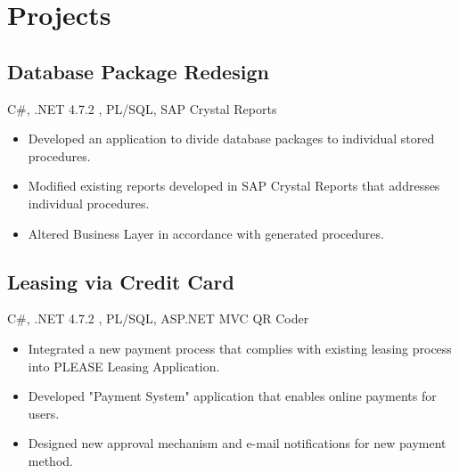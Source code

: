 \documentclass[1pt,a4paper,verdana]{moderncv} %
\begin{document}
\section{Projects}
\subsection{Database Package Redesign}
 {C\#, .NET 4.7.2 , PL/SQL, SAP Crystal Reports }
 {\begin{itemize}
		\item Developed an application to divide database packages to individual stored procedures.
		\item Modified existing reports developed in SAP Crystal Reports that addresses individual procedures.
		\item Altered Business Layer in accordance with generated procedures.
\end{itemize}}


\subsection{Leasing via Credit Card}
 {C\#, .NET 4.7.2 , PL/SQL, ASP.NET MVC}
 {QR Coder}
 {\begin{itemize}
		\item Integrated a new payment process that complies with existing leasing process into PLEASE Leasing Application.
		\item Developed  "Payment System" application that enables online payments for users.
		\item Designed new approval mechanism and e-mail notifications for new payment method.
\end{itemize}}
\end{document}
